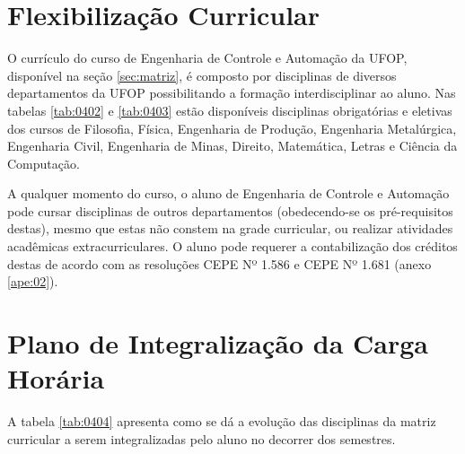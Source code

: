 \section{Flexibilização Curricular}
O currículo do curso de Engenharia de Controle e Automação da UFOP, disponível na seção \ref{sec:matriz}, é composto por disciplinas de diversos departamentos da UFOP possibilitando a formação interdisciplinar ao aluno. Nas tabelas \ref{tab:0402} e \ref{tab:0403} estão disponíveis disciplinas obrigatórias e eletivas dos cursos de Filosofia, Física, Engenharia de Produção, Engenharia Metalúrgica, Engenharia Civil, Engenharia de Minas, Direito, Matemática, Letras e Ciência da Computação. 

A qualquer momento do curso, o aluno de Engenharia de Controle e Automação pode cursar disciplinas de outros departamentos (obedecendo-se os pré-requisitos destas), mesmo que estas não constem na grade curricular, ou realizar atividades acadêmicas extracurriculares. O aluno pode requerer a contabilização dos créditos destas de acordo com as resoluções CEPE  Nº  1.586 e CEPE  Nº  1.681 (anexo \ref{ape:02}).

\section{Plano de Integralização da Carga Horária}

A tabela \ref{tab:0404} apresenta como se dá a evolução das disciplinas da matriz curricular a serem integralizadas pelo aluno no decorrer dos semestres.

